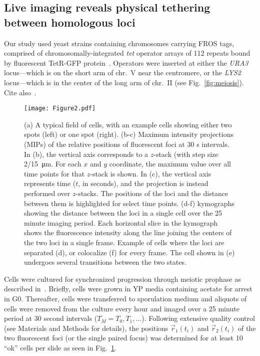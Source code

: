 \documentclass[9pt,twocolumn,twoside,lineno]{pnas-new}
\begin{document}
\subsection*{Live imaging reveals physical tethering between homologous loci}

Our study used yeast strains containing chromosomes carrying FROS tags, comprised
of chromosomally-integrated \textit{tet} operator arrays of 112 repeats bound by fluorescent TetR-GFP protein~\cite{brar2009}.
Operators were inserted at either the \textit{URA3} locus---which is on the short arm of
chr.~V near the centromere, or the \textit{LYS2} locus---which is in the center of the long arm of chr.~II (see Fig.~\ref{fig:meiosis}). Cite also~\cite{marston2004,michaelis1997}.

\begin{figure}[t!]
\centering
\texttt{[image: Figure2.pdf]}
\caption{(a) A typical field of cells, with an example cells showing either two spots (left)
     or one spot (right). (b-c) Maximum intensity projections (MIPs) of the relative positions of fluorescent foci at 30 s intervals. In (b), the vertical axis corresponds to a $z$-stack (with step size \SI{2/15}{\micro\meter}. For each $x$ and $y$ coordinate, the maximum value over all time points for that $z$-stack is shown. In (c), the vertical axis represents time ($t$, in seconds), and the projection is instead performed over $z$-stacks. The positions of the loci and the distance between them is highlighted for select time points. (d-f) kymographs showing the distance between the loci in a single cell over the 25 minute imaging period. Each horizontal slice in the kymograph shows the fluorescence intensity along the line joining the centers of the two loci in a single frame. Example of cells where the loci are separated (d), or colocalize (f) for every frame. The cell shown in (e) undergoes several transitions between the two states.
}\label{fig:exp-setup}
\end{figure}

Cells were cultured for synchronized progression through meiotic prophase as described in~\cite{lui2009}. Briefly, cells were grown in YP media containing acetate for arrest in G0. Thereafter, cells were transferred to sporulation medium and aliquots of cells were removed from the culture  every hour and imaged over a 25 minute period at 30 second intervals ($T_M = T_0, T_1, \ldots$). Following extensive quality control (see Materials and Methods for details), the
positions $\vec{r}_1(t_i)$ and $\vec{r}_2(t_i)$ of the two fluorescent foci
(or the single paired focus) was determined for at least 10 “ok” cells per slide as seen in
Fig.~\ref{fig:exp-setup}.
\end{document}
